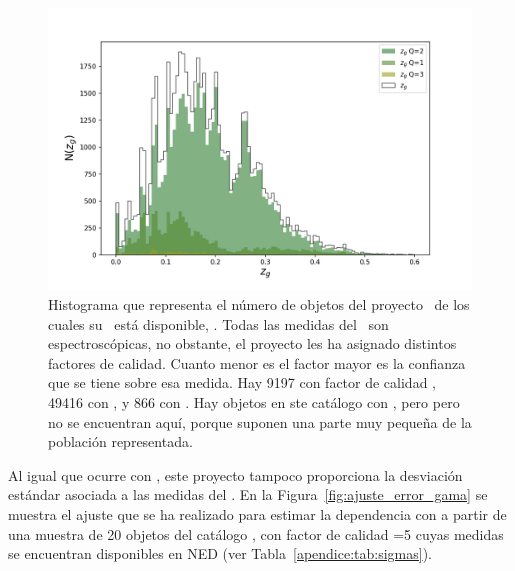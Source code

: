 \begin{figure}[htb]
    \begin{center}
         \includegraphics[width=15cm]{2_Muestras/histograma_z_gama_disponible.png}
    \end{center}
    \vspace*{-10mm}
    \caption{\small Histograma que representa el número de objetos del proyecto \gama\ de los cuales su \rt\  está disponible, . Todas las medidas del \rt\ son espectroscópicas, no obstante, el proyecto les ha asignado distintos factores de calidad. Cuanto menor es el factor  mayor es la confianza que se tiene sobre esa medida. Hay 9197 con factor de calidad , 49416 con , y 866 con . Hay objetos en ste catálogo con , pero pero no se encuentran aquí, porque suponen una parte muy pequeña de la población representada.}
    \label{fig:histograma_z_gama}
\end{figure}

Al igual que ocurre con \hatlas, este proyecto tampoco proporciona la desviación estándar asociada a las medidas del \rt. En la Figura~\ref{fig:ajuste_error_gama} se muestra el ajuste que se ha realizado para estimar la dependencia  con  a partir de una muestra de 20 objetos del catálogo \gama, con factor de calidad =5 cuyas medidas se encuentran disponibles en NED (ver Tabla~\ref{apendice:tab:sigmas}).

